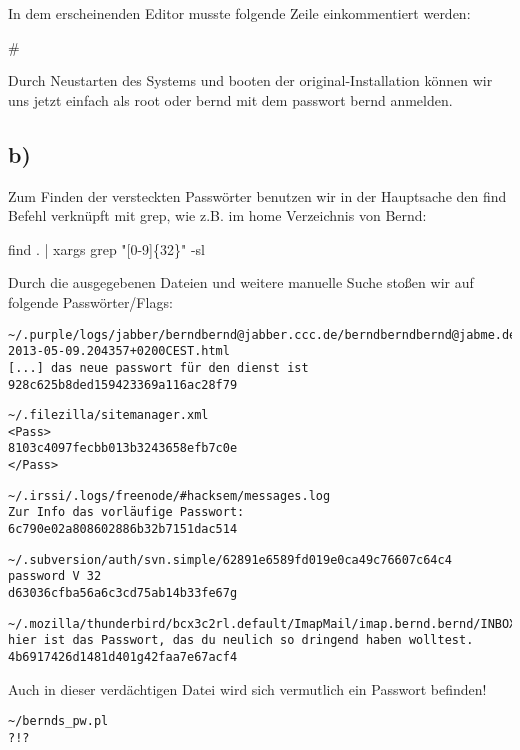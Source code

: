 \documentclass[10pt,a4paper]{article}
\begin{document}
In dem erscheinenden Editor musste folgende Zeile einkommentiert werden:

\# %

Durch Neustarten des Systems und booten der original-Installation können wir uns jetzt einfach als root oder bernd mit dem passwort bernd anmelden.

\subsection*{b)}

Zum Finden der versteckten Passwörter benutzen wir in der Hauptsache den find Befehl verknüpft mit grep, wie z.B. im home Verzeichnis von Bernd:

find . | xargs grep "[0-9]\{32\}" -sl

Durch die ausgegebenen Dateien und weitere manuelle Suche stoßen wir auf folgende Passwörter/Flags:

\begin{verbatim}
~/.purple/logs/jabber/berndbernd@jabber.ccc.de/berndberndbernd@jabme.de/
2013-05-09.204357+0200CEST.html
[...] das neue passwort für den dienst ist
928c625b8ded159423369a116ac28f79
\end{verbatim}

\begin{verbatim}
~/.filezilla/sitemanager.xml
<Pass>
8103c4097fecbb013b3243658efb7c0e
</Pass>
\end{verbatim}

\begin{verbatim}
~/.irssi/.logs/freenode/#hacksem/messages.log
Zur Info das vorläufige Passwort:
6c790e02a808602886b32b7151dac514
\end{verbatim}

\begin{verbatim}
~/.subversion/auth/svn.simple/62891e6589fd019e0ca49c76607c64c4
password V 32
d63036cfba56a6c3cd75ab14b33fe67g
\end{verbatim}

\begin{verbatim}
~/.mozilla/thunderbird/bcx3c2rl.default/ImapMail/imap.bernd.bernd/INBOX
hier ist das Passwort, das du neulich so dringend haben wolltest.
4b6917426d1481d401g42faa7e67acf4
\end{verbatim}

Auch in dieser verdächtigen Datei wird sich vermutlich ein Passwort befinden!

\begin{verbatim}
~/bernds_pw.pl
?!?
\end{verbatim}
\end{document}
